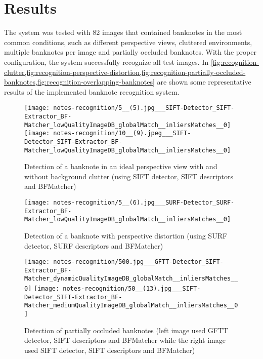 \section{Results}\label{sec:results}

The system was tested with 82 images that contained banknotes in the most common conditions, such as different perspective views, cluttered environments, multiple banknotes per image and partially occluded banknotes. With the proper configuration, the system successfully recognize all test images. In \cref{fig:recognition-clutter,fig:recognition-perspective-distortion,fig:recognition-partially-occluded-banknotes,fig:recognition-overlapping-banknotes} are shown some representative results of the implemented banknote recognition system.

\begin{figure}[H]
	\centering
	\texttt{[image: notes-recognition/5\_\_(5).jpg\_\_\_SIFT-Detector\_SIFT-Extractor\_BF-Matcher\_lowQualityImageDB\_globalMatch\_\_inliersMatches\_\_0]}\hfill
	\texttt{[image: notes-recognition/10\_\_(9).jpeg\_\_\_SIFT-Detector\_SIFT-Extractor\_BF-Matcher\_lowQualityImageDB\_globalMatch\_\_inliersMatches\_\_0]}
	\caption{Detection of a banknote in an ideal perspective view with and without background clutter (using SIFT detector, SIFT descriptors and BFMatcher)}
	\label{fig:recognition-clutter}
\end{figure}

\begin{figure}[H]
	\centering
	\texttt{[image: notes-recognition/5\_\_(6).jpg\_\_\_SURF-Detector\_SURF-Extractor\_BF-Matcher\_lowQualityImageDB\_globalMatch\_\_inliersMatches\_\_0]}
	\caption{Detection of a banknote with perspective distortion (using SURF detector, SURF descriptors and BFMatcher)}
	\label{fig:recognition-perspective-distortion}
\end{figure}

\begin{figure}[H]
	\centering
	\texttt{[image: notes-recognition/500.jpg\_\_\_GFTT-Detector\_SIFT-Extractor\_BF-Matcher\_dynamicQualityImageDB\_globalMatch\_\_inliersMatches\_\_0]}\hfill
	\texttt{[image: notes-recognition/50\_\_(13).jpg\_\_\_SIFT-Detector\_SIFT-Extractor\_BF-Matcher\_mediumQualityImageDB\_globalMatch\_\_inliersMatches\_\_0]}
	\caption{Detection of partially occluded banknotes (left image used GFTT detector, SIFT descriptors and BFMatcher while the right image used SIFT detector, SIFT descriptors and BFMatcher)}
	\label{fig:recognition-partially-occluded-banknotes}
\end{figure}


